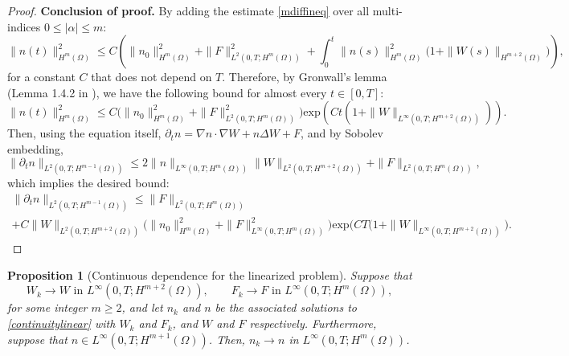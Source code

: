 \documentclass[12pt]{article}
\theoremstyle{plain}
\newtheorem{proposition}{Proposition}[section]
\begin{document}
\begin{proof}
\noindent \textbf{Conclusion of proof.} By adding the estimate \eqref{mdiffineq} over all multi-indices $0 \le |\alpha| \le m$:
\begin{equation*}
\|n(t)\|^{2}_{H^{m}(\Omega)} \le C\left(\|n_{0}\|^{2}_{H^{m}(\Omega)} + \|F\|_{L^{2}(0, T; H^{m}(\Omega))}^{2} + \int_{0}^{t} \|n(s)\|^{2}_{H^{m}(\Omega)} \Big(1 + \|W(s)\|_{H^{m + 2}(\Omega)}\Big)\right),
\end{equation*}
for a constant $C$ that does not depend on $T$. Therefore, by Gronwall's lemma (Lemma 1.4.2 in \cite{BFH18}), we have the following bound for almost every $t \in [0, T]$:
\begin{equation*}
\|n(t)\|_{H^{m}(\Omega)}^{2} \le C\Big(\|n_{0}\|_{H^{m}(\Omega)}^{2} + \|F\|^{2}_{L^{2}(0, T; H^{m}(\Omega))}\Big) \text{exp}\left(Ct\left(1 + \|W\|_{L^{\infty}(0, T; H^{m + 2}(\Omega))}\right)\right).
\end{equation*}
Then, using the equation itself, $\partial_{t}n = \nabla n \cdot \nabla W + n \Delta W + F$, and by Sobolev embedding,
\begin{equation*}
\|\partial_{t}n\|_{L^{2}(0, T; H^{m - 1}(\Omega))} \le 2\|n\|_{L^{\infty}(0, T; H^{m}(\Omega))} \|W\|_{L^{2}(0, T; H^{m + 2}(\Omega))} + \|F\|_{L^{2}(0, T; H^{m}(\Omega))},
\end{equation*}
which implies the desired bound:
\begin{multline*}
\|\partial_{t}n\|_{L^{2}(0, T; H^{m - 1}(\Omega))} \le \|F\|_{L^{2}(0, T; H^{m}(\Omega))} \\
+ C\|W\|_{L^{2}(0, T; H^{m + 2}(\Omega))} \Big(\|n_{0}\|_{H^{m}(\Omega)}^{2} + \|F\|_{L^{\infty}(0, T; H^{m}(\Omega))}^{2}\Big) \text{exp}\Big(CT(1 + \|W\|_{L^{\infty}(0, T; H^{m + 2}(\Omega))}\Big).
\end{multline*}
\end{proof}

\begin{proposition}[Continuous dependence for the linearized problem]\label{continuousdependence}
    Suppose that 
    \begin{equation*}
    W_{k} \to W \text{ in } L^{\infty}(0, T; H^{m + 2}(\Omega)), \qquad F_{k} \to F \text{ in } L^{\infty}(0, T; H^{m}(\Omega)),
    \end{equation*}
    for some integer $m \ge 2$, and let $n_{k}$ and $n$ be the associated solutions to \eqref{continuitylinear} with $W_{k}$ and $F_{k}$, and $W$ and $F$ respectively. Furthermore, suppose that $n \in L^{\infty}(0, T; H^{m + 1}(\Omega))$. Then, $n_{k} \to n$ in $L^{\infty}(0, T; H^{m}(\Omega))$.
\end{proposition}
\end{document}

